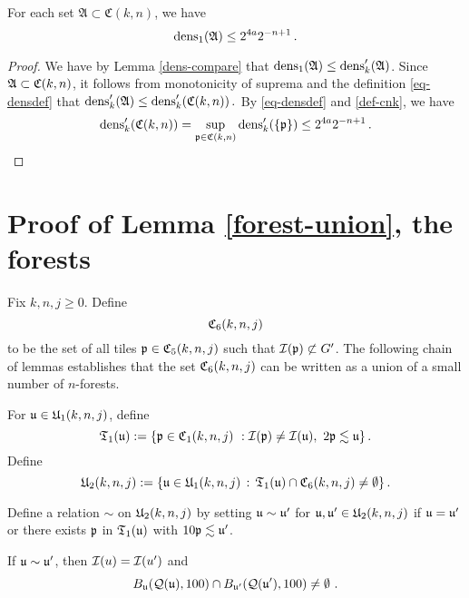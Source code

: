 {\begin{lemma}[C dens1]
    \label{C-dens1}
    For each set $\mathfrak{A} \subset \mathfrak{C}(k,n)$, we have
    $$
        \dens_1(\mathfrak{A}) \le 2^{4a}2^{-n+1}\,.
    $$
\end{lemma}

\begin{proof}
    We have by Lemma \ref{dens-compare} that
    $\dens_1(\mathfrak{A}) \le \dens_k'(\mathfrak{A})$. Since $\mathfrak{A} \subset \fC(k,n)$, it follows from monotonicity of suprema and the definition \eqref{eq-densdef} that
    $
        \dens_k'(\mathfrak{A}) \le \dens_k'(\fC(k,n))\,.
    $
    By \eqref{eq-densdef} and \eqref{def-cnk}, we have
    $$
        \dens_k'(\fC(k,n)) = \sup_{\fp \in \fC(k,n)} \dens_k'(\{\fp\}) \le 2^{4a}2^{-n+1}\,.
    $$
\end{proof}

\section{Proof of Lemma \ref{forest-union}, the forests}
\label{subsecforest}

Fix $k,n,j\ge 0$.
Define
$$
    \fC_6(k,n,j)
$$
to be the set of all tiles $\fp \in \fC_5(k,n,j)$ such that $\sc(\fp) \not\subset G'$. The following chain of lemmas
establishes that the set $\fC_6(k,n,j)$ can be written as a union of a small number of $n$-forests.

For $\fu\in \fU_1(k,n,j)$, define
\begin{equation}
    \label{eq-T1-def}
    \mathfrak{T}_1(\fu):= \{\fp \in \fC_1(k,n,j) \ : \sc(\fp)\neq \sc(\fu), \ 2\fp \lesssim  \fu\}\,.
\end{equation}
Define
\begin{equation}
    \label{eq-U2-def}
    \fU_2(k,n,j) := \{ \fu \in \fU_1(k,n,j) \, : \, \mathfrak{T}_1(\fu)  \cap \fC_6(k,n,j) \ne \emptyset\}\,.
\end{equation}

Define a relation $\sim$ on $\fU_2(k,n,j)$
by setting $\fu\sim \fu'$
for $\fu,\fu'\in \fU_2(k,n,j)$
if $\fu=\fu'$ or there exists $\fp$ in $\mathfrak{T}_1(\fu)$
with $10 \fp\lesssim \fu'$.

\begin{lemma}
    \label{relation-geometry}
    If $\fu \sim \fu'$, then $\sc(u) = \sc(u')$ and
    \begin{equation*}
        B_{\fu}(\fcc(\fu), 100) \cap B_{\fu'}(\fcc(\fu'), 100) \neq \emptyset\ .
    \end{equation*}
\end{lemma}

}
